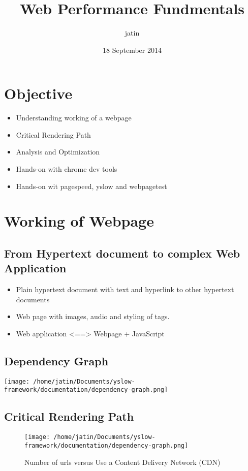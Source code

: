 \documentclass[11pt]{article}
\title{Web Performance Fundmentals}
\author{jatin}
\date{18 September 2014}
\begin{document}
\maketitle

\setcounter{tocdepth}{3}
\tableofcontents
\vspace*{1cm}
\section{Objective}
\label{sec-1}

\begin{itemize}
\item Understanding working of a webpage
\item Critical Rendering Path
\item Analysis and Optimization
\item Hands-on with chrome dev tools
\item Hands-on wit pagespeed, yslow and webpagetest
\end{itemize}
\section{Working of Webpage}
\label{sec-2}

\subsection{From Hypertext document to complex Web Application}
\label{sec-2.1}

\begin{itemize}
\item Plain hypertext document with text and hyperlink to other hypertext documents
\item Web page with images, audio and styling of tags.
\item Web application <==> Webpage + JavaScript
\end{itemize}
\subsection{Dependency Graph}
\label{sec-2.2}

\texttt{[image: /home/jatin/Documents/yslow-framework/documentation/dependency-graph.png]}
\subsection{Critical Rendering Path}
\label{sec-2.3}

\begin{figure}[ht]
 \centering
  \texttt{[image: /home/jatin/Documents/yslow-framework/documentation/dependency-graph.png]}
\caption{Number of urls versus Use a Content Delivery Network (CDN)}    
\label{fig:dg}
\end{figure}   
\end{document}
